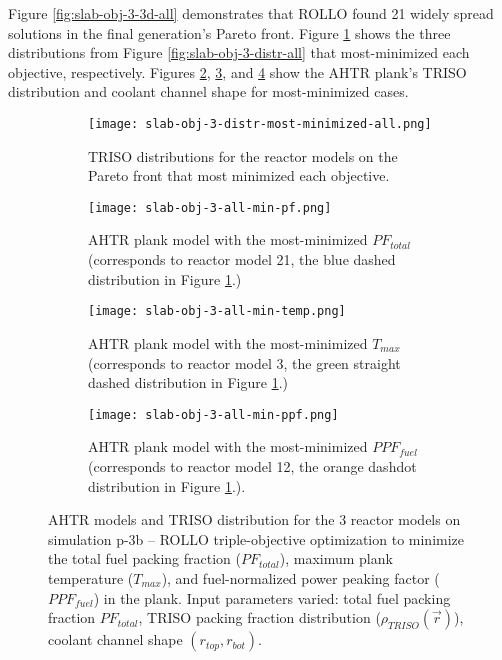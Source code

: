 Figure \ref{fig:slab-obj-3-3d-all} demonstrates that \gls{ROLLO} found 21 widely spread 
solutions in the final generation's Pareto front. 
Figure \ref{fig:slab-obj-3-distr-most-minimized-distr-all} shows the three distributions 
from Figure \ref{fig:slab-obj-3-distr-all} that most-minimized each objective, 
respectively.
Figures \ref{fig:slab-obj-3-all-min-pf}, \ref{fig:slab-obj-3-all-min-temp}, and 
\ref{fig:slab-obj-3-all-min-ppf} show the \gls{AHTR} plank's TRISO distribution and 
coolant channel shape for most-minimized cases. 
\begin{figure}[htbp!]
    \begin{subfigure}{\textwidth}
        \texttt{[image: slab-obj-3-distr-most-minimized-all.png]}
        \caption{TRISO distributions for the reactor models on the Pareto 
        front that most minimized each objective.}
        \label{fig:slab-obj-3-distr-most-minimized-distr-all}
    \end{subfigure}
    \begin{subfigure}{\textwidth}
        \texttt{[image: slab-obj-3-all-min-pf.png]}
        \caption{\gls{AHTR} plank model with the most-minimized $PF_{total}$ 
        (corresponds to reactor model 21, the blue dashed distribution in 
        Figure \ref{fig:slab-obj-3-distr-most-minimized-distr-all}.)}
        \label{fig:slab-obj-3-all-min-pf}
    \end{subfigure}
    \begin{subfigure}{\textwidth}
        \texttt{[image: slab-obj-3-all-min-temp.png]}
        \caption{\gls{AHTR} plank model with the most-minimized $T_{max}$
        (corresponds to reactor model 3, the green straight dashed distribution 
        in Figure \ref{fig:slab-obj-3-distr-most-minimized-distr-all}.)}
        \label{fig:slab-obj-3-all-min-temp}
    \end{subfigure}
    \begin{subfigure}{\textwidth}
        \texttt{[image: slab-obj-3-all-min-ppf.png]}
        \caption{\gls{AHTR} plank model with the most-minimized $PPF_{fuel}$
        (corresponds to reactor model 12, the orange dashdot distribution 
        in Figure \ref{fig:slab-obj-3-distr-most-minimized-distr-all}.).}
        \label{fig:slab-obj-3-all-min-ppf}
    \end{subfigure}
    \caption{AHTR models and TRISO distribution for the 3 reactor models on simulation 
    p-3b -- ROLLO triple-objective optimization to minimize the total 
    fuel packing fraction ($PF_{total}$), maximum plank temperature ($T_{max}$), and 
    fuel-normalized power peaking factor ($PPF_{fuel}$) in the plank. 
    Input parameters varied: total fuel packing fraction $PF_{total}$, 
    TRISO packing fraction distribution ($\rho_{TRISO}(\vec{r})$), 
    coolant channel shape $(r_{top}, r_{bot})$.}
    \label{fig:slab-obj-3-distr-most-minimized-all}
\end{figure}

